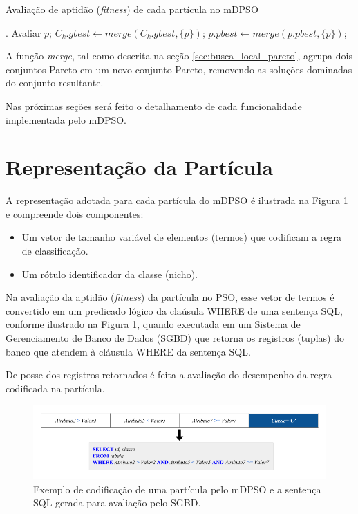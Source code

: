 \documentclass[
	12pt,				%
	openany,			%
	oneside,	
	a4paper,			%
	brazil,				%
	]{unimontes-ppgmsc-abntex2}
\begin{document}
\begin{algorithm}[ht]
\caption{Avaliação de aptidão ({\em fitness}) de cada partícula no mDPSO}
\label{alg:pseudo_mdpso_aval}
\begin{algorithmic}[1]
.
      \State Avaliar $p$;
      \State $C_k.gbest \leftarrow merge(C_k.gbest, \{p\})$;
      \State $p.pbest \leftarrow merge(p.pbest, \{p\})$;
  \EndFor
\end{algorithmic}
\end{algorithm}

A função {\em merge}, tal como descrita na seção \ref{sec:busca_local_pareto}, agrupa dois conjuntos Pareto em um novo conjunto Pareto, removendo as soluções dominadas do conjunto resultante.

Nas próximas seções será feito o detalhamento de cada funcionalidade implementada pelo mDPSO.

\section{Representação da Partícula}
\label{sec:mdpso_repr_part}

A representação adotada para cada partícula do mDPSO é ilustrada na Figura \ref{fig:representacao} e compreende dois componentes:

\begin{itemize}
\item Um vetor de tamanho variável de elementos (termos) que codificam a regra de classificação.
\item Um rótulo identificador da classe (nicho).
\end{itemize}

Na avaliação da aptidão ({\em fitness}) da partícula no PSO, esse vetor de termos é convertido em um predicado lógico da claúsula WHERE de uma sentença SQL, conforme ilustrado na Figura \ref{fig:representacao}, quando executada em um Sistema de Gerenciamento de Banco de Dados (SGBD) que retorna os registros (tuplas) do banco que atendem à cláusula WHERE da sentença SQL. 

De posse dos registros retornados é feita a avaliação do desempenho da regra codificada na partícula.

\begin{figure}[ht]
\centering
\includegraphics[scale=.5]{img/representacao}
\caption{Exemplo de codificação de uma partícula pelo mDPSO e a sentença SQL gerada para avaliação pelo SGBD.}
\label{fig:representacao}
\end{figure}
\end{document}
